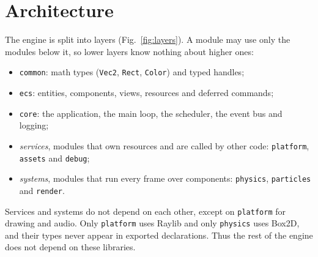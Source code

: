\documentclass[conference]{IEEEtran}
\newcommand{\code}[1]{\texttt{#1}}
\begin{document}
\section{Architecture}

The engine is split into layers (Fig.~\ref{fig:layers}). A module may use only the
modules below it, so lower layers know nothing about higher ones:
\begin{itemize}
    \item \code{common}: math types (\code{Vec2}, \code{Rect}, \code{Color}) and typed
          handles;
    \item \code{ecs}: entities, components, views, resources and deferred commands;
    \item \code{core}: the application, the main loop, the scheduler, the event bus and
          logging;
    \item \emph{services}, modules that own resources and are called by other code:
          \code{platform}, \code{assets} and \code{debug};
    \item \emph{systems}, modules that run every frame over components: \code{physics},
          \code{particles} and \code{render}.
\end{itemize}
Services and systems do not depend on each other, except on \code{platform} for drawing
and audio. Only \code{platform} uses Raylib and only \code{physics} uses Box2D, and their
types never appear in exported declarations. Thus the rest of the engine does not depend
on these libraries.
\end{document}

